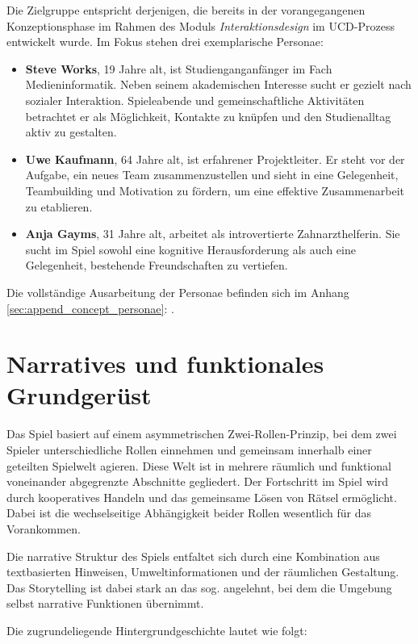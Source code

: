Die Zielgruppe entspricht derjenigen, die bereits in der vorangegangenen Konzeptionsphase im Rahmen des Moduls \textit{Interaktionsdesign} im \ac{UCD}-Prozess entwickelt wurde. Im Fokus stehen drei exemplarische Personae:

\begin{itemize}
    \item \textbf{Steve Works}, 19 Jahre alt, ist Studienganganfänger im Fach Medieninformatik. Neben seinem akademischen Interesse sucht er gezielt nach sozialer Interaktion. Spieleabende und gemeinschaftliche Aktivitäten betrachtet er als Möglichkeit, Kontakte zu knüpfen und den Studienalltag aktiv zu gestalten.
    \item \textbf{Uwe Kaufmann}, 64 Jahre alt, ist erfahrener Projektleiter. Er steht vor der Aufgabe, ein neues Team zusammenzustellen und sieht in  eine Gelegenheit, Teambuilding und Motivation zu fördern, um eine effektive Zusammenarbeit zu etablieren.
    \item \textbf{Anja Gayms}, 31 Jahre alt, arbeitet als introvertierte Zahnarzthelferin. Sie sucht im Spiel sowohl eine kognitive Herausforderung als auch eine Gelegenheit, bestehende Freundschaften zu vertiefen.
\end{itemize}

Die vollständige Ausarbeitung der Personae befinden sich im Anhang \ref{sec:append_concept_personae}: .

\section{Narratives und funktionales Grundgerüst}
Das Spiel basiert auf einem asymmetrischen Zwei-Rollen-Prinzip, bei dem zwei Spieler unterschiedliche Rollen einnehmen und gemeinsam innerhalb einer geteilten Spielwelt agieren. Diese Welt ist in mehrere räumlich und funktional voneinander abgegrenzte Abschnitte gegliedert. Der Fortschritt im Spiel wird durch kooperatives Handeln und das gemeinsame Lösen von Rätsel ermöglicht. Dabei ist die wechselseitige Abhängigkeit beider Rollen wesentlich für das Vorankommen.

Die narrative Struktur des Spiels entfaltet sich durch eine Kombination aus textbasierten Hinweisen, Umweltinformationen und der räumlichen Gestaltung. Das Storytelling ist dabei stark an das sog.  angelehnt, bei dem die Umgebung selbst narrative Funktionen übernimmt.

Die zugrundeliegende Hintergrundgeschichte lautet wie folgt:

